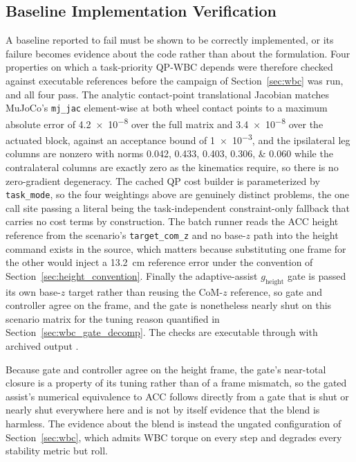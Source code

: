 \documentclass[a4paper,fleqn]{cas-dc}
\begin{document}
\subsection{Baseline Implementation Verification}
\label{sec:wbc_verification_sec}

A baseline reported to fail must be shown to be correctly implemented, or its
failure becomes evidence about the code rather than about the formulation. Four
properties on which a task-priority QP-WBC depends were therefore checked
against executable references before the campaign of Section~\ref{sec:wbc} was
run, and all four pass. The analytic contact-point translational Jacobian
matches MuJoCo's \texttt{mj\_jac} element-wise at both wheel contact points to a
maximum absolute error of \num{4.2e-8} over the full matrix and \num{3.4e-8}
over the actuated block, against an acceptance bound of \num{1e-3}, and the
ipsilateral leg columns are nonzero with norms
\numlist{0.042;0.433;0.403;0.306;0.060} while the contralateral columns are
exactly zero as the kinematics require, so there is no zero-gradient degeneracy.
The cached QP cost builder is parameterized by \texttt{task\_mode}, so the four
weightings above are genuinely distinct problems, the one call site passing a
literal being the task-independent constraint-only fallback that carries no cost
terms by construction. The batch runner reads the ACC height reference from the
scenario's \texttt{target\_com\_z} and no base-$z$ path into the height command
exists in the source, which matters because substituting one frame for the other
would inject a \SI{13.2}{cm} reference error under the convention of
Section~\ref{sec:height_convention}. Finally the adaptive-assist
$g_{\text{height}}$ gate is passed its own base-$z$ target rather than reusing
the CoM-$z$ reference, so gate and controller agree on the frame, and the gate
is nonetheless nearly shut on this scenario matrix for the tuning reason
quantified in Section~\ref{sec:wbc_gate_decomp}. The checks are executable
through  with archived output
.

Because gate and controller agree on the height frame, the gate's near-total
closure is a property of its tuning rather than of a frame mismatch, so the gated
assist's numerical equivalence to ACC follows directly from a gate that is shut
or nearly shut everywhere here and is not by itself evidence that the blend is
harmless. The evidence about the blend is instead the ungated configuration of
Section~\ref{sec:wbc}, which admits WBC torque on every step and degrades every
stability metric but roll.
\end{document}
